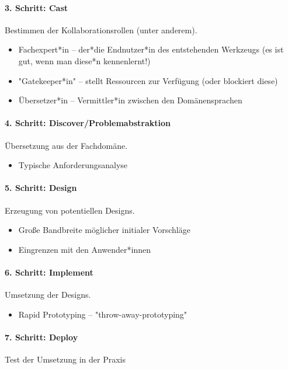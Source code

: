 			\paragraph{3. Schritt: Cast}
			Bestimmen der Kollaborationsrollen (unter anderem).
			\begin{itemize}
				\item Fachexpert*in -- der*die Endnutzer*in des entstehenden Werkzeugs (es ist gut, wenn man diese*n kennenlernt!)
				\item "Gatekeeper*in" -- stellt Ressourcen zur Verfügung (oder blockiert diese)
				\item Übersetzer*in -- Vermittler*in zwischen den Domänensprachen
			\end{itemize}

			\paragraph{4. Schritt: Discover/Problemabstraktion}
			Übersetzung aus der Fachdomäne.
			\begin{itemize}
				\item Typische Anforderungsanalyse
			\end{itemize}

			\paragraph{5. Schritt: Design}
			Erzeugung von potentiellen Designs.
			\begin{itemize}
				\item Große Bandbreite möglicher initialer Vorschläge
				\item Eingrenzen mit den Anwender*innen
			\end{itemize}

			\paragraph{6. Schritt: Implement}
			Umsetzung der Designs.
			\begin{itemize}
				\item Rapid Prototyping -- "throw-away-prototyping"
			\end{itemize}

			\paragraph{7. Schritt: Deploy}
			Test der Umsetzung in der Praxis

